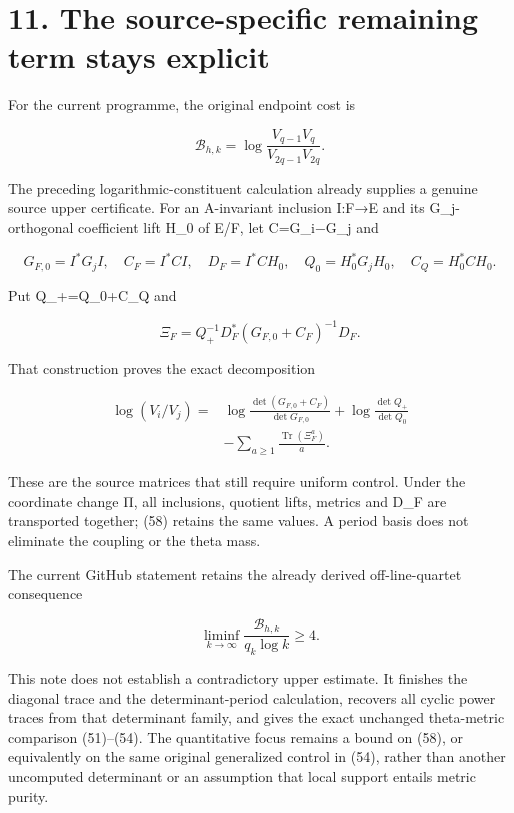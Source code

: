 \documentclass[
  11pt,
]{article}
\begin{document}
\section{11. The source-specific remaining term stays
explicit}\label{the-source-specific-remaining-term-stays-explicit}

For the current programme, the original endpoint cost is

\[
\mathcal B_{h,k}
 =\log\frac{V_{q-1}V_q}{V_{2q-1}V_{2q}}.
\tag{55}
\]

The preceding logarithmic-constituent calculation already supplies a
genuine source upper certificate. For an A-invariant inclusion I:F→E and
its G\_j-orthogonal coefficient lift H\_0 of E/F, let C=G\_i−G\_j and

\[
G_{F,0}=I^*G_jI,\quad C_F=I^*CI,\quad
D_F=I^*CH_0,\quad Q_0=H_0^*G_jH_0,\quad C_Q=H_0^*CH_0.
\tag{56}
\]

Put Q\_+=Q\_0+C\_Q and

\[
\Xi_F=Q_+^{-1}D_F^*(G_{F,0}+C_F)^{-1}D_F.
\tag{57}
\]

That construction proves the exact decomposition

\[
\begin{aligned}
\log(V_i/V_j)
={}&\log\frac{\det(G_{F,0}+C_F)}{\det G_{F,0}}
 +\log\frac{\det Q_+}{\det Q_0}\\
&-\sum_{a\ge1}\frac{\operatorname{Tr}(\Xi_F^a)}a.
\end{aligned}
\tag{58}
\]

These are the source matrices that still require uniform control. Under
the coordinate change Π, all inclusions, quotient lifts, metrics and
D\_F are transported together; (58) retains the same values. A period
basis does not eliminate the coupling or the theta mass.

The current GitHub statement retains the already derived
off-line-quartet consequence

\[
\liminf_{k\to\infty}\frac{\mathcal B_{h,k}}{q_k\log k}\ge4.
\tag{59}
\]

This note does not establish a contradictory upper estimate. It finishes
the diagonal trace and the determinant-period calculation, recovers all
cyclic power traces from that determinant family, and gives the exact
unchanged theta-metric comparison (51)--(54). The quantitative focus
remains a bound on (58), or equivalently on the same original
generalized control in (54), rather than another uncomputed determinant
or an assumption that local support entails metric purity.
\end{document}
